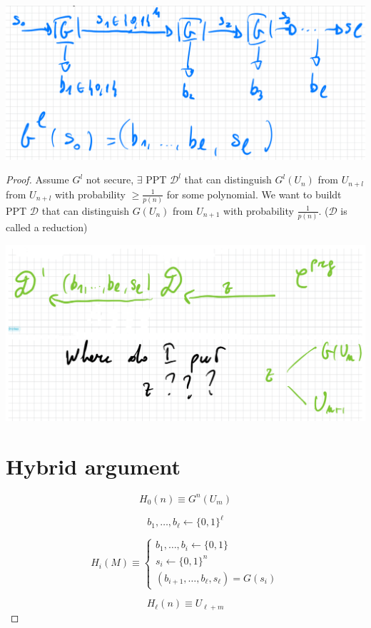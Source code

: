 \documentclass[11pt, a4paper]{article}
\begin{document}
\begin{center}
    \includegraphics[scale=0.4]{img/Comp_sec/BlueGen.png}
\end{center}
\begin{proof}
    Assume $G^l$ not secure, $\exists$ PPT $\mathcal{D}^l$ that can distinguish $G^l(U_n)$ from $U_{n+l}$ from $U_{n+l}$ with probability $\geq \frac{1}{p(n)}$ for some polynomial. We want to buildt PPT $\mathcal{D}$ that can
    distinguish $G(U_n)$ from $U_{n+1}$ with probability $\frac{1}{p(n)}$. ($\mathcal{D}$ is called a reduction)
    \begin{center}
        \includegraphics[scale=0.4]{img/Comp_sec/Hybrid_arg_img.png}
    \end{center}
\section*{Hybrid argument}

\[
H_0(n) \equiv G^{n}(U_m)
\]

\[
b_1, \ldots, b_\ell \leftarrow \{0,1\}^\ell
\]

\[
H_i(M) \equiv
\begin{cases}
b_1, \ldots, b_i \leftarrow \{0,1\} \\
s_i \leftarrow \{0,1\}^n \\
(b_{i+1}, \ldots, b_\ell, s_\ell) = G(s_i)
\end{cases}
\]

\[
H_\ell(n) \equiv U_{\ell + m}
\]

\end{proof}
\end{document}
